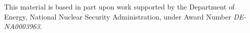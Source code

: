 \begin{frame}\frametitle{}

\vspace*{0.2in}

\begin{center}

\vspace*{0.35in}
\vspace{5mm}
\begin{minipage}{0.8\textwidth}
This material is based in part upon work supported by the Department of Energy, National Nuclear Security Administration, under Award Number \textit{DE-NA0003963}.
\end{minipage}
\end{center}
\end{frame}


